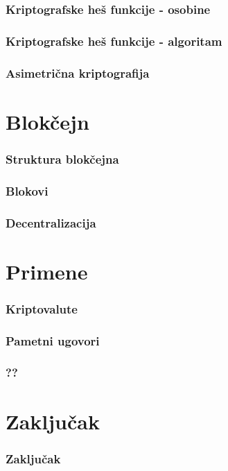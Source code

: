 \documentclass{beamer}
\begin{document}
\begin{frame}[fragile]\frametitle{Kriptografske heš funkcije - osobine}
	
\end{frame}

\begin{frame}[fragile]\frametitle{Kriptografske heš funkcije - algoritam}
	
\end{frame}

\begin{frame}[fragile]\frametitle{Asimetrična kriptografija}
	
\end{frame}


\section{Blokčejn}

\begin{frame}[fragile]\frametitle{Struktura blokčejna}
	
\end{frame}

\begin{frame}[fragile]\frametitle{Blokovi}
	
\end{frame}

\begin{frame}[fragile]\frametitle{Decentralizacija}
	
\end{frame}


\section{Primene}

\begin{frame}[fragile]\frametitle{Kriptovalute}
	
\end{frame}

\begin{frame}[fragile]\frametitle{Pametni ugovori}
	
\end{frame}

\begin{frame}[fragile]\frametitle{??}
	
\end{frame}


\section{Zaključak}

\begin{frame}[fragile]\frametitle{Zaključak}
	
\end{frame}
\end{document}
